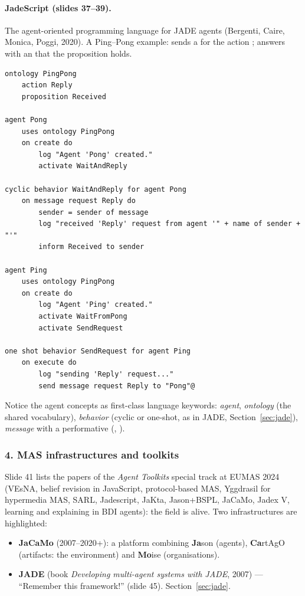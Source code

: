\paragraph{JadeScript (slides 37--39).} The agent-oriented programming language for JADE
agents (Bergenti, Caire, Monica, Poggi, 2020). A Ping--Pong example:  sends a
 for the action ;  answers with an  that
the proposition  holds.
\begin{verbatim}
ontology PingPong
    action Reply
    proposition Received

agent Pong
    uses ontology PingPong
    on create do
        log "Agent 'Pong' created."
        activate WaitAndReply

cyclic behavior WaitAndReply for agent Pong
    on message request Reply do
        sender = sender of message
        log "received 'Reply' request from agent '" + name of sender + "'"
        inform Received to sender

agent Ping
    uses ontology PingPong
    on create do
        log "Agent 'Ping' created."
        activate WaitFromPong
        activate SendRequest

one shot behavior SendRequest for agent Ping
    on execute do
        log "sending 'Reply' request..."
        send message request Reply to "Pong"@
\end{verbatim}
Notice the agent concepts as first-class language keywords: \emph{agent},
\emph{ontology} (the shared vocabulary), \emph{behavior} (cyclic or one-shot, as in JADE,
Section~\ref{sec:jade}), \emph{message} with a performative (,
).

\subsubsection{4. MAS infrastructures and toolkits}

Slide 41 lists the papers of the \emph{Agent Toolkits} special track at EUMAS 2024 (VEsNA,
belief revision in JavaScript, protocol-based MAS, Yggdrasil for hypermedia MAS, SARL,
Jadescript, JaKta, Jason+BSPL, JaCaMo, Jadex V, learning and explaining in BDI agents): the
field is alive. Two infrastructures are highlighted:
\begin{itemize}
  \item \textbf{JaCaMo} (2007--2020+): a platform combining \textbf{Ja}son (agents),
        \textbf{Ca}rtAgO (artifacts: the environment) and \textbf{Mo}ise (organisations).
  \item \textbf{JADE} (book \emph{Developing multi-agent systems with JADE}, 2007) ---
        ``Remember this framework!'' (slide 45). Section~\ref{sec:jade}.
\end{itemize}

